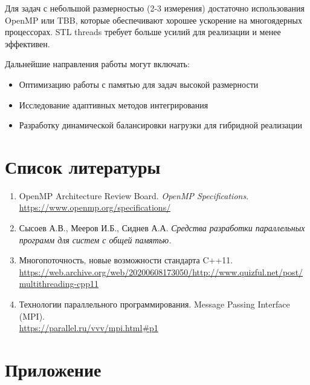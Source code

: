 \documentclass[14pt,a4paper]{extarticle}
\begin{document}
Для задач с небольшой размерностью (2-3 измерения) достаточно использования OpenMP или TBB, которые обеспечивают хорошее ускорение на многоядерных процессорах. STL threads требует больше усилий для реализации и менее эффективен.

Дальнейшие направления работы могут включать:
\begin{itemize}
    \item Оптимизацию работы с памятью для задач высокой размерности
    \item Исследование адаптивных методов интегрирования
    \item Разработку динамической балансировки нагрузки для гибридной реализации
\end{itemize}
\newpage

\section{Список литературы}

\begin{enumerate}
    \item OpenMP Architecture Review Board. \textit{OpenMP Specifications}. \url{https://www.openmp.org/specifications/}
    
    \item Сысоев А.В., Мееров И.Б., Сиднев А.А. \textit{Средства разработки параллельных программ для систем с общей памятью.}
    
    \item Многопоточность, новые возможности стандарта C++11. \\ 
    \url{https://web.archive.org/web/20200608173050/http://www.quizful.net/post/multithreading-cpp11}
    
    \item Технологии параллельного программирования. Message Passing Interface (MPI). \\ 
    \url{https://parallel.ru/vvv/mpi.html#p1}
\end{enumerate}
\newpage

\section{Приложение}
\end{document}
